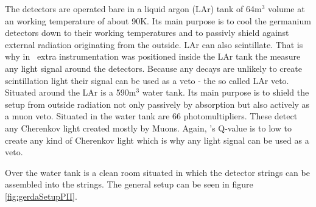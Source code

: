 \documentclass[encoding=utf8,british]{tumphthesis}
\begin{document}
The detectors are operated bare in a liquid argon (LAr) tank of 64m$^3$ volume at an working temperature of about 90K.
Its main purpose is to cool the germanium detectors down to their working temperatures and to passivly shield against external radiation originating from the outside.
LAr can also scintillate.
That is why in \PII\ extra instrumentation was positioned inside the LAr tank the measure any light signal around the detectors.
Because any  decays are unlikely to create scintillation light their signal can be used as a veto - the so called LAr veto.
\\

Situated around the LAr is a 590m$^3$ water tank.
Its main purpose is to shield the setup from outside radiation not only passively by absorption but also actively as a muon veto.
Situated in the water tank are 66 photomultipliers.
These detect any Cherenkov light created mostly by Muons.
Again, 's Q-value is to low to create any kind of Cherenkov light which is why any light signal can be used as a veto.

Over the water tank is a clean room situated in which the detector strings can be assembled into the strings.  
The general setup can be seen in figure \ref{fig:gerdaSetupPII}.
\\
\end{document}

